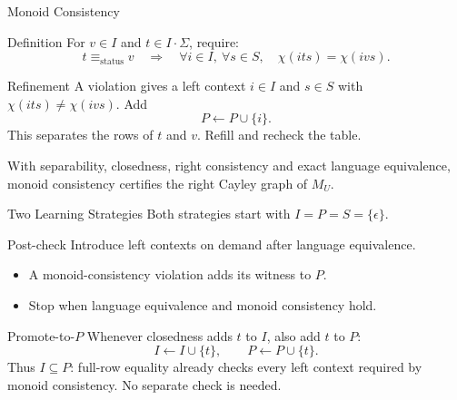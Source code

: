 \documentclass{beamer}
\begin{document}
\begin{frame}{Monoid Consistency}
    \begin{block}{Definition}
        For $v\in I$ and $t\in I\cdot\Sigma$, require:
        \[
        t\equiv_{\mathrm{status}}v
        \quad\Longrightarrow\quad
        \forall i\in I,\ \forall s\in S,\quad \chi(its)=\chi(ivs).
        \]
    \end{block}
    \begin{block}{Refinement}
        A violation gives a left context $i\in I$ and $s\in S$ with
        $\chi(its)\neq\chi(ivs)$. Add
        $$
        P\leftarrow P\cup\{i\}.
        $$
        This separates the rows of $t$ and $v$. Refill and recheck the table.
    \end{block}
    {\small With separability, closedness, right consistency and exact language equivalence,
    monoid consistency certifies the right Cayley graph of $M_U$.}
\end{frame}

\begin{frame}{Two Learning Strategies}
    Both strategies start with $I=P=S=\{\epsilon\}$.
    \begin{block}{Post-check}
        Introduce left contexts on demand after language equivalence.
        \begin{itemize}
            \item A monoid-consistency violation adds its witness to $P$.
            \item Stop when language equivalence and monoid consistency hold.
        \end{itemize}
    \end{block}
    \begin{block}{Promote-to-$P$}
        Whenever closedness adds $t$ to $I$, also add $t$ to $P$:
        $$
        I\leftarrow I\cup\{t\},\qquad P\leftarrow P\cup\{t\}.
        $$
        Thus $I\subseteq P$: full-row equality already checks every left
        context required by monoid consistency. No separate check is needed.
    \end{block}
\end{frame}
\end{document}

